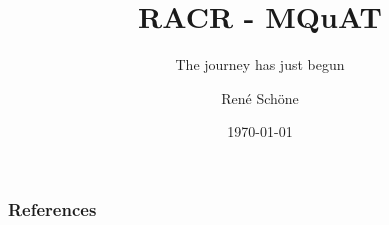\documentclass[english]{beamer}
\title{RACR - MQuAT}
\subtitle{The journey has just begun}
\author{René Schöne}
\institute{Institut für Software- und Multimediatechnik}
\date{\today}
\begin{document}
\maketitle



\begin{frame}
\frametitle{References}

\end{frame}
\end{document}
